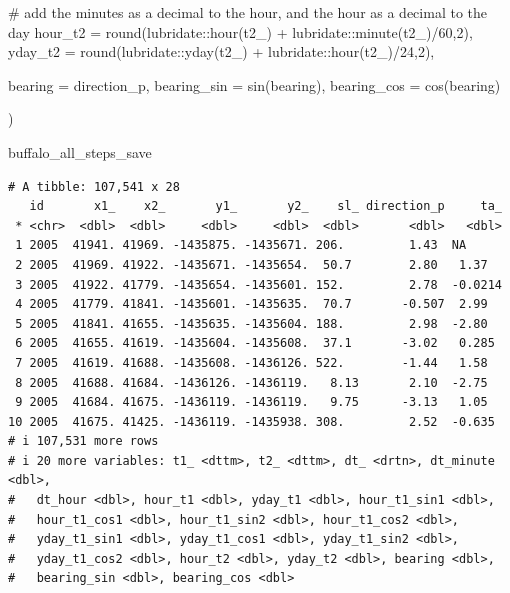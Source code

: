 \documentclass[
  letterpaper,
  DIV=11,
  numbers=noendperiod]{scrartcl}
\newenvironment{Shaded}{\begin{snugshade}}{\end{snugshade}}
\newcommand{\AttributeTok}[1]{\textcolor[rgb]{0.40,0.45,0.13}{#1}}
\newcommand{\CommentTok}[1]{\textcolor[rgb]{0.37,0.37,0.37}{#1}}
\newcommand{\DecValTok}[1]{\textcolor[rgb]{0.68,0.00,0.00}{#1}}
\newcommand{\FunctionTok}[1]{\textcolor[rgb]{0.28,0.35,0.67}{#1}}
\newcommand{\NormalTok}[1]{\textcolor[rgb]{0.00,0.23,0.31}{#1}}
\newcommand{\SpecialCharTok}[1]{\textcolor[rgb]{0.37,0.37,0.37}{#1}}
\begin{document}
\begin{Shaded}
\begin{Highlighting}[]
  \CommentTok{\# add the minutes as a decimal to the hour, and the hour as a decimal to the day}
  \AttributeTok{hour\_t2 =} \FunctionTok{round}\NormalTok{(lubridate}\SpecialCharTok{::}\FunctionTok{hour}\NormalTok{(t2\_) }\SpecialCharTok{+}\NormalTok{ lubridate}\SpecialCharTok{::}\FunctionTok{minute}\NormalTok{(t2\_)}\SpecialCharTok{/}\DecValTok{60}\NormalTok{,}\DecValTok{2}\NormalTok{),}
  \AttributeTok{yday\_t2 =} \FunctionTok{round}\NormalTok{(lubridate}\SpecialCharTok{::}\FunctionTok{yday}\NormalTok{(t2\_) }\SpecialCharTok{+}\NormalTok{ lubridate}\SpecialCharTok{::}\FunctionTok{hour}\NormalTok{(t2\_)}\SpecialCharTok{/}\DecValTok{24}\NormalTok{,}\DecValTok{2}\NormalTok{),}
  
  \AttributeTok{bearing =}\NormalTok{ direction\_p,}
  \AttributeTok{bearing\_sin =} \FunctionTok{sin}\NormalTok{(bearing),}
  \AttributeTok{bearing\_cos =} \FunctionTok{cos}\NormalTok{(bearing)}
  
\NormalTok{)}

\NormalTok{buffalo\_all\_steps\_save}
\end{Highlighting}
\end{Shaded}

\begin{verbatim}
# A tibble: 107,541 x 28
   id       x1_    x2_       y1_       y2_    sl_ direction_p     ta_
 * <chr>  <dbl>  <dbl>     <dbl>     <dbl>  <dbl>       <dbl>   <dbl>
 1 2005  41941. 41969. -1435875. -1435671. 206.         1.43  NA     
 2 2005  41969. 41922. -1435671. -1435654.  50.7        2.80   1.37  
 3 2005  41922. 41779. -1435654. -1435601. 152.         2.78  -0.0214
 4 2005  41779. 41841. -1435601. -1435635.  70.7       -0.507  2.99  
 5 2005  41841. 41655. -1435635. -1435604. 188.         2.98  -2.80  
 6 2005  41655. 41619. -1435604. -1435608.  37.1       -3.02   0.285 
 7 2005  41619. 41688. -1435608. -1436126. 522.        -1.44   1.58  
 8 2005  41688. 41684. -1436126. -1436119.   8.13       2.10  -2.75  
 9 2005  41684. 41675. -1436119. -1436119.   9.75      -3.13   1.05  
10 2005  41675. 41425. -1436119. -1435938. 308.         2.52  -0.635 
# i 107,531 more rows
# i 20 more variables: t1_ <dttm>, t2_ <dttm>, dt_ <drtn>, dt_minute <dbl>,
#   dt_hour <dbl>, hour_t1 <dbl>, yday_t1 <dbl>, hour_t1_sin1 <dbl>,
#   hour_t1_cos1 <dbl>, hour_t1_sin2 <dbl>, hour_t1_cos2 <dbl>,
#   yday_t1_sin1 <dbl>, yday_t1_cos1 <dbl>, yday_t1_sin2 <dbl>,
#   yday_t1_cos2 <dbl>, hour_t2 <dbl>, yday_t2 <dbl>, bearing <dbl>,
#   bearing_sin <dbl>, bearing_cos <dbl>
\end{verbatim}
\end{document}
